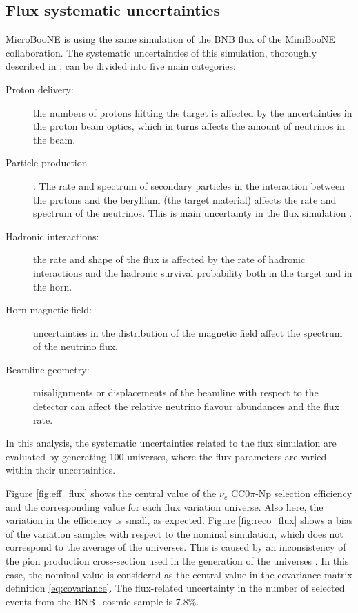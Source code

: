 \subsection{Flux systematic uncertainties}
MicroBooNE is using the same simulation of the BNB flux of the MiniBooNE collaboration. The systematic uncertainties of this simulation, thoroughly described in \cite{AguilarArevalo:2008yp}, can be divided into five main categories:
\begin{description}
\item[Proton delivery:] the numbers of protons hitting the target is affected by the uncertainties in the proton beam optics, which in turns affects the amount of neutrinos in the beam.
\item[Particle production]. The rate and spectrum of secondary particles in the interaction between the protons and the beryllium (the target material) affects the rate and spectrum of the neutrinos. This is main uncertainty in the flux simulation \cite{AguilarArevalo:2008yp}.
\item[Hadronic interactions:] the rate and shape of the flux is affected by the rate of hadronic interactions and the hadronic survival probability both in the target and in the horn.
\item[Horn magnetic field:] uncertainties in the distribution of the magnetic field affect the spectrum of the neutrino flux.
\item[Beamline geometry:] misalignments or displacements of the beamline with respect to the detector can affect the relative neutrino flavour abundances and the flux rate.
\end{description}

In this analysis, the systematic uncertainties related to the flux simulation are evaluated by generating 100 universes, where the flux parameters are varied within their uncertainties. 

Figure \ref{fig:eff_flux} shows the central value of the $\nu_{e}$ CC0$\pi$-Np selection efficiency and the corresponding value for each flux variation universe. Also here, the variation in the efficiency is small, as expected. Figure \ref{fig:reco_flux} shows a bias of the variation samples with respect to the nominal simulation, which does not correspond to the average of the universes. This is caused by an inconsistency of the pion production cross-section used in the generation of the universes \cite{ubxsec}. In this case, the nominal value is considered as the central value in the covariance matrix definition \eqref{eq:covariance}. The flux-related uncertainty in the number of selected events from the BNB+cosmic sample is 7.8\%.

